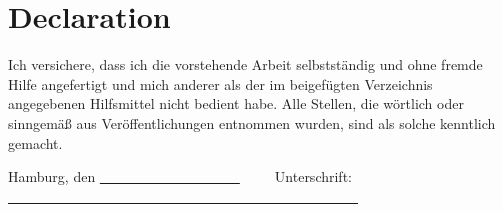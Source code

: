 \chapter*{Declaration}
Ich versichere, dass ich die vorstehende Arbeit selbstständig und ohne fremde Hilfe angefertigt und mich anderer als der im beigefügten Verzeichnis angegebenen Hilfsmittel nicht bedient habe. Alle Stellen, die wörtlich oder sinngemäß aus Veröffentlichungen entnommen wurden, sind als solche kenntlich gemacht. \\


\vspace{2cm} 

\noindent Hamburg, den \uline{~~~~~~~~~~~~~~~~~~~~}~~~~~Unterschrift: \uline{~~~~~~~~~~~~~~~~~~~~~~~~~~~~~~~~~~~~~~~~~~~~~~~~~~} 

